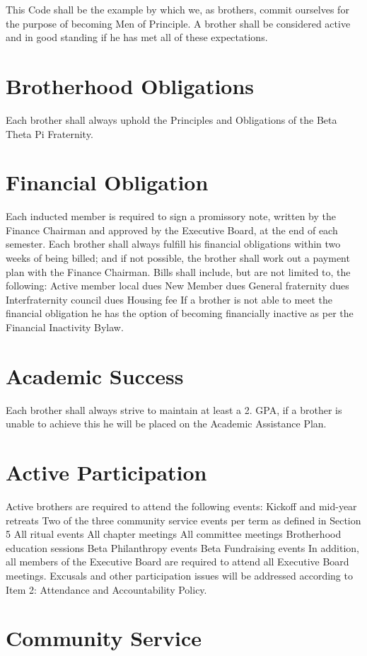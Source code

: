 
This Code shall be the example by which we, as brothers, commit ourselves for the purpose of becoming Men of Principle.
A brother shall be considered active and in good standing if he has met all of these expectations.
\section{Brotherhood Obligations}
Each brother shall always uphold the Principles and Obligations of the Beta Theta Pi Fraternity.
\section{Financial Obligation}
Each inducted member is required to sign a promissory note, written by the Finance Chairman and approved by the Executive Board, at the end of each semester.
Each brother shall always fulfill his financial obligations within two weeks of being billed; and if not possible, the brother shall work out a payment plan with the Finance Chairman.
Bills shall include, but are not limited to, the following:
Active member local dues
New Member dues
General fraternity dues
Interfraternity council dues
Housing fee
If a brother is not able to meet the financial obligation he has the option of becoming financially inactive as per the Financial Inactivity Bylaw.
\section{Academic Success}
Each brother shall always strive to maintain at least a 2.
 GPA, if a brother is unable to achieve this he will be placed on the Academic Assistance Plan.
\section{Active Participation}
Active brothers are required to attend the following events:
Kickoff and mid-year retreats
Two of the three community service events per term as defined in Section 5
All ritual events
All chapter meetings
All committee meetings
Brotherhood education sessions
Beta Philanthropy events
Beta Fundraising events
In addition, all members of the Executive Board are required to attend all Executive Board meetings.
Excusals and other participation issues will be addressed according to Item 2: Attendance and Accountability Policy.

\section{Community Service}
